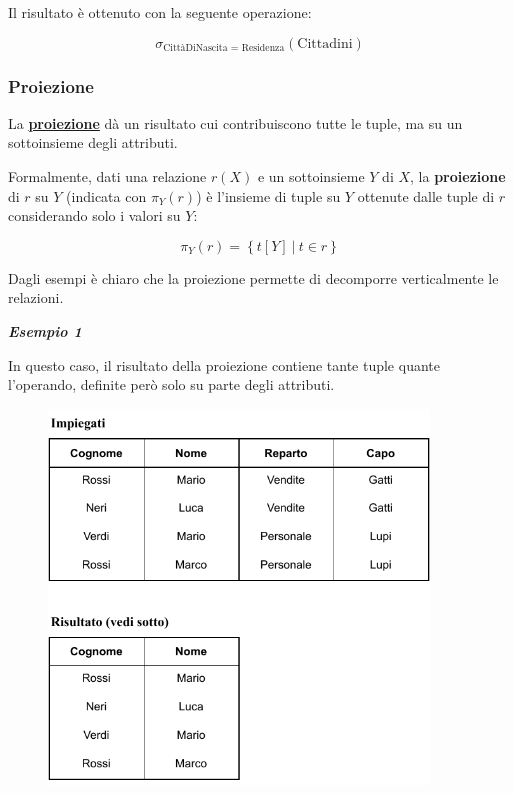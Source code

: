 \documentclass[a4paper]{article}
\begin{document}
	\noindent
	Il risultato è ottenuto con la seguente operazione:
	
	\begin{equation*}
		\sigma_{\text{CittàDiNascita } = \text{ Residenza}}\left(\text{Cittadini}\right)
	\end{equation*}
	
	\newpage
	
	\subsubsection{Proiezione}
	
	La \textcolor{Red3}{\textbf{\underline{proiezione}}} dà un risultato cui contribuiscono tutte le tuple, ma su un sottoinsieme degli attributi.
	
	Formalmente, dati una relazione $r\left(X\right)$ e un sottoinsieme $Y$ di $X$, la \textbf{proiezione} di $r$ su $Y$ (indicata con $\pi_{Y}\left(r\right)$) è l'insieme di tuple su $Y$ ottenute dalle tuple di $r$ considerando solo i valori su $Y$:
	
	\begin{equation*}
		\pi_{Y}\left(r\right) = \left\{t\left[Y\right] \: | \: t \in r\right\}
	\end{equation*}

	\noindent
	Dagli esempi è chiaro che la proiezione permette di decomporre verticalmente le relazioni.\newline
	
	\noindent
	\textcolor{Green4}{\textbf{\emph{Esempio 1}}}\newline
	
	\noindent
	In questo caso, il risultato della proiezione contiene tante tuple quante l'operando, definite però solo su parte degli attributi.
	
	\begin{figure}[!htp]
		\centering
		\includegraphics[width=0.9\textwidth]{img/proiezione1.pdf}
	\end{figure}
	
\end{document}
